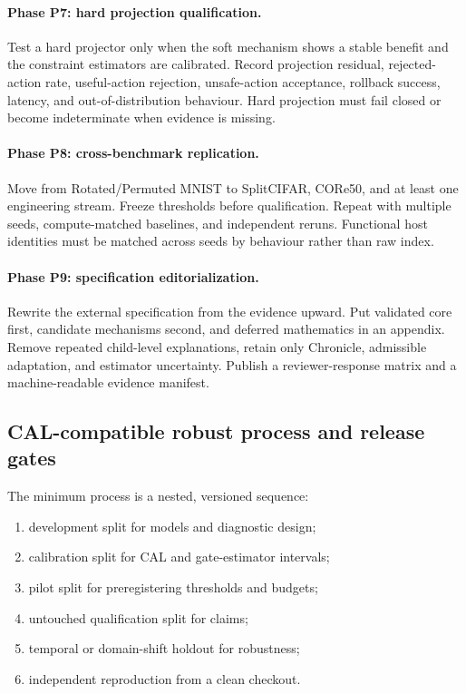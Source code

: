 \documentclass[11pt,a4paper]{article}
\begin{document}
\paragraph{Phase P7: hard projection qualification.}
Test a hard projector only when the soft mechanism shows a stable benefit and the constraint estimators are calibrated. Record projection residual, rejected-action rate, useful-action rejection, unsafe-action acceptance, rollback success, latency, and out-of-distribution behaviour. Hard projection must fail closed or become indeterminate when evidence is missing.

\paragraph{Phase P8: cross-benchmark replication.}
Move from Rotated/Permuted MNIST to SplitCIFAR, CORe50, and at least one engineering stream. Freeze thresholds before qualification. Repeat with multiple seeds, compute-matched baselines, and independent reruns. Functional host identities must be matched across seeds by behaviour rather than raw index.

\paragraph{Phase P9: specification editorialization.}
Rewrite the external specification from the evidence upward. Put validated core first, candidate mechanisms second, and deferred mathematics in an appendix. Remove repeated child-level explanations, retain only Chronicle, admissible adaptation, and estimator uncertainty. Publish a reviewer-response matrix and a machine-readable evidence manifest.

\subsection{CAL-compatible robust process and release gates}
The minimum process is a nested, versioned sequence:
\begin{enumerate}
\item development split for models and diagnostic design;
\item calibration split for CAL and gate-estimator intervals;
\item pilot split for preregistering thresholds and budgets;
\item untouched qualification split for claims;
\item temporal or domain-shift holdout for robustness;
\item independent reproduction from a clean checkout.
\end{enumerate}
\end{document}
